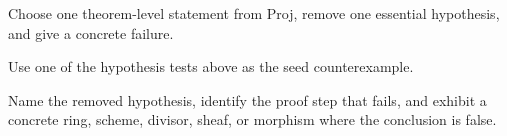 \begin{exercise}\label{exr:vi35-expand-16}
Choose one theorem-level statement from Proj, remove one essential hypothesis, and give a concrete failure.
\end{exercise}
\begin{hint}
Use one of the hypothesis tests above as the seed counterexample.
\end{hint}
\begin{solution}
Name the removed hypothesis, identify the proof step that fails, and exhibit a concrete ring, scheme, divisor, sheaf, or morphism where the conclusion is false.
\end{solution}

